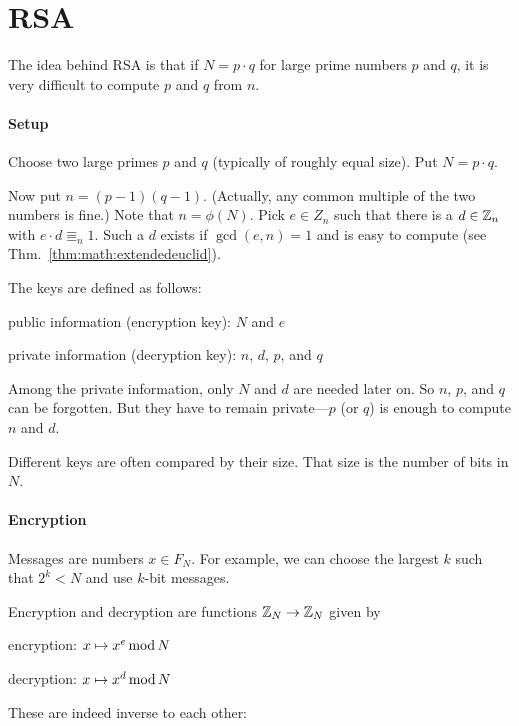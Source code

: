 \section{RSA}

The idea behind RSA is that if $N=p\cdot q$ for large prime numbers $p$ and $q$, it is very difficult to compute $p$ and $q$ from $n$.

\paragraph{Setup}
Choose two large primes $p$ and $q$ (typically of roughly equal size).
Put $N=p\cdot q$.

Now put $n=(p-1)(q-1)$. (Actually, any common multiple of the two numbers is fine.)
Note that $n=\phi(N)$.
Pick $e\in Z_n$ such that there is a $d\in\mathbb{Z}_n$ with $e\cdot d\Equiv_n 1$.
Such a $d$ exists if $\gcd(e,n)=1$ and is easy to compute (see Thm.~\ref{thm:math:extendedeuclid}).

The keys are defined as follows:
\begin{compactitem}
 \item public information (encryption key): $N$ and $e$
 \item private information (decryption key): $n$, $d$, $p$, and $q$
\end{compactitem}
Among the private information, only $N$ and $d$ are needed later on.
So $n$, $p$, and $q$ can be forgotten.
But they have to remain private---$p$ (or $q$) is enough to compute $n$ and $d$.

Different keys are often compared by their size.
That size is the number of bits in $N$.

\paragraph{Encryption}
Messages are numbers $x\in F_N$.
For example, we can choose the largest $k$ such that $2^k<N$ and use $k$-bit messages.

Encryption and decryption are functions $\mathbb{Z}_N\to \mathbb{Z}_N$ given by
\begin{compactitem}
 \item encryption: $x\mapsto x^e\mathop{\mathrm{mod}} N$
 \item decryption: $x\mapsto x^d\mathop{\mathrm{mod}} N$
\end{compactitem}

These are indeed inverse to each other:

